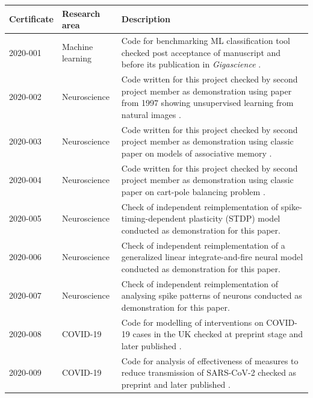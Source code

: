 \documentclass[12pt]{article}
\begin{document}
\begin{table}
  \footnotesize

  \centering

  \begin{tabular}{llp{12cm}}
    \toprule
    \textbf{Certificate} & \textbf{Research area} & \textbf{Description} \\ \midrule
    2020-001 \cite{cert-2020-001} & Machine learning & Code for benchmarking ML classification tool checked post acceptance of manuscript and before its publication in \textit{Gigascience} \cite{Piccolo2020-lo}. \\
    2020-002  \cite{cert-2020-002} & Neuroscience & Code written for this project checked by second project member as demonstration using paper from 1997 showing unsupervised learning from natural images \cite{Hancock1992-mp}. \\
    2020-003  \cite{cert-2020-003} & Neuroscience &  Code written for this project checked by second project member as demonstration using classic paper on models of associative memory \cite{Hopfield1982-mz}. \\
    2020-004  \cite{cert-2020-004} & Neuroscience & Code written for this project checked by second project member as demonstration using classic paper on cart-pole balancing problem \cite{Barto1983-rg}. \\
    2020-005  \cite{cert-2020-005} & Neuroscience & Check of independent reimplementation of spike-timing-dependent plasticity (STDP) model \cite{larisch_re_2019} conducted as demonstration for this paper. \\ %
    2020-006  \cite{cert-2020-006} & Neuroscience & Check of independent reimplementation of a generalized linear integrate-and-fire neural model \cite{detorakis_re_2017} conducted as demonstration for this paper. \\
    2020-007  \cite{cert-2020-007} & Neuroscience & Check of independent reimplementation of analysing spike patterns of neurons \cite{hathway_re_2018} conducted as demonstration for this paper. \\
    2020-008  \cite{cert-2020-008} & COVID-19 & Code for modelling of interventions on COVID-19 cases in the UK checked at preprint stage \cite{davies-preprint-2020} and later published \cite{Davies2020-vj}. \\
    2020-009  \cite{cert-2020-009} & COVID-19 & Code for analysis of effectiveness of measures to reduce transmission of SARS-CoV-2 checked as preprint \cite{kucharski-preprint-2020} and later published \cite{kucharski_effectiveness_2020}. \\ %

\end{tabular}
\end{table}
\end{document}
